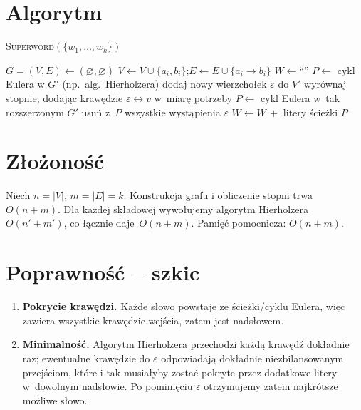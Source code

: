 \documentclass[11pt,a4paper]{article}
\begin{document}
\section*{Algorytm}

\begin{algorithm}[H]
\caption{\textsc{Superword}$(\{w_1,\dots,w_k\})$}
\begin{algorithmic}[1]
\State $G=(V,E)\gets(\varnothing,\varnothing)$
  \State $V\gets V\cup\{a_i,b_i\}$;\quad $E\gets E\cup\{a_i\!\to b_i\}$
\EndFor
\State $W\gets\text{``''}$
     \State $P\gets$ cykl Eulera w $G'$ (np.\ alg.~Hierholzera)
  \Else
     \State dodaj nowy wierzchołek $\varepsilon$ do $V'$
     \State wyrównaj stopnie, dodając krawędzie
            $\varepsilon\!\leftrightarrow v$ w~miarę potrzeby
     \State $P\gets$ cykl Eulera w~tak rozszerzonym $G'$
     \State usuń z~$P$ wszystkie wystąpienia $\varepsilon$
  \EndIf
  \State $W\gets W\,+$ litery ścieżki $P$
\EndFor
\State {}
\end{algorithmic}
\end{algorithm}

\section*{Złożoność}

Niech $n=|V|$, $m=|E|=k$.
Konstrukcja grafu i obliczenie stopni trwa $O(n+m)$.
Dla każdej składowej wywołujemy algorytm Hierholzera
$O(n'+m')$, co łącznie daje~$O(n+m)$.
Pamięć pomocnicza: $O(n+m)$.

\section*{Poprawność -- szkic}

\begin{enumerate}
  \item \textbf{Pokrycie krawędzi.} Każde słowo powstaje ze
        ścieżki/cyklu Eulera, więc zawiera wszystkie krawędzie wejścia,
        zatem jest nadsłowem.
  \item \textbf{Minimalność.} Algorytm Hierholzera przechodzi każdą
        krawędź dokładnie raz; ewentualne krawędzie do $\varepsilon$
        odpowiadają dokładnie niezbilansowanym przejściom, które i tak
        musiałyby zostać pokryte przez dodatkowe litery w~dowolnym
        nadsłowie.  Po pominięciu $\varepsilon$ otrzymujemy zatem
        najkrótsze możliwe słowo.
\end{enumerate}
\end{document}

